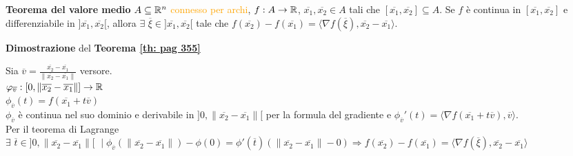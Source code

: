 \begin{theorem} \textbf{Teorema del valore medio}
	\label{th: pag 355}
	$A \subseteq \mathbb{R}^n$ \textcolor{orange}{connesso per archi}, $f:A\rightarrow \mathbb{R}$, $\overline{x_1},\overline{x_2}\in A$ tali che $[\overline{x_1},\overline{x_2}]\subseteq A$. Se $f$ è continua in $[\overline{x_1},\overline{x_2}]$ e differenziabile in $]\overline{x_1},\overline{x_2}[$, allora $\exists\,\, \overline{\xi} \in]\overline{x_1},\overline{x_2}[$ tale che $f(\overline{x_2})-f(\overline{x_1})=\langle \nabla f(\overline{\xi}),\overline{x_2}-\overline{x_1} \rangle$.
\end{theorem}


\begin{attbar}
	\textbf{Dimostrazione} del \textbf{Teorema \ref{th: pag 355}}
		
	Sia $\overline{v}=\frac{\overline{x_2}-\overline{x_1}}{\|\overline{x_2}-\overline{x_1}\|}$ versore.\\
	$\varphi_{\overline{v}}:[0,\|\overline{x_2}-\overline{x_1}\|]\rightarrow\mathbb{R}$\\
	$\phi_{\overline{v}}(t)=f(\overline{x_1}+t\overline{v})$\\
	$\phi_{\overline{v}}$ è continua nel suo dominio e derivabile in $]0,\| \overline{x_2}-\overline{x_1} \|[$ per la formula del gradiente e $\phi_{\overline{v}}'(t)=\langle\nabla f(\overline{x_1}+t\overline{v}),\overline{v}\rangle$. \\
	Per il teorema di Lagrange $\exists\,\, \overline{t}\in]0,\|\overline{x_2}-\overline{x_1}\|[\,\, \mid \phi_{\overline{v}}(\|\overline{x_2}-\overline{x_1}\|)-\phi(0)=\phi'(\overline{t})(\|\overline{x_2}-\overline{x_1}\|-0)\Rightarrow f(\overline{x_2})-f(\overline{x_1})=\langle\nabla f(\overline{\xi}),\overline{x_2}-\overline{x_1}\rangle$
\end{attbar}



